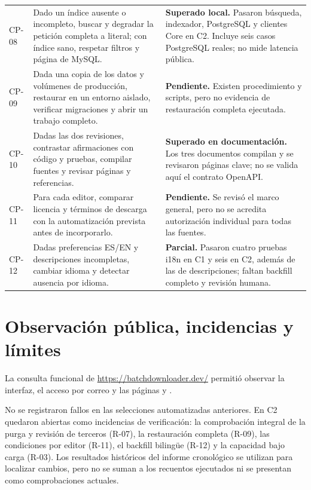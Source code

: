 \begin{longtable}{p{}>{\raggedright\arraybackslash}p{}>{\raggedright\arraybackslash}p{}}
CP-08 & Dado un índice ausente o incompleto, buscar y degradar la petición completa a literal; con índice sano, respetar filtros y página de MySQL. & \textbf{Superado local.} Pasaron búsqueda, indexador, PostgreSQL y clientes Core en C2. Incluye seis casos PostgreSQL reales; no mide latencia pública.\\
CP-09 & Dada una copia de los datos y volúmenes de producción, restaurar en un entorno aislado, verificar migraciones y abrir un trabajo completo. & \textbf{Pendiente.} Existen procedimiento y scripts, pero no evidencia de restauración completa ejecutada.\\
CP-10 & Dadas las dos revisiones, contrastar afirmaciones con código y pruebas, compilar fuentes y revisar páginas y referencias. & \textbf{Superado en documentación.} Los tres documentos compilan y se revisaron páginas clave; no se valida aquí el contrato OpenAPI.\\
CP-11 & Para cada editor, comparar licencia y términos de descarga con la automatización prevista antes de incorporarlo. & \textbf{Pendiente.} Se revisó el marco general, pero no se acredita autorización individual para todas las fuentes.\\
CP-12 & Dadas preferencias ES/EN y descripciones incompletas, cambiar idioma y detectar ausencia por idioma. & \textbf{Parcial.} Pasaron cuatro pruebas i18n en C1 y seis en C2, además de las de descripciones; faltan backfill completo y revisión humana.\\
\bottomrule
\end{longtable}
\endgroup

\section{Observación pública, incidencias y límites}

La consulta funcional de \url{https://batchdownloader.dev/} permitió observar la interfaz, el acceso por correo y las páginas  y .

No se registraron fallos en las selecciones automatizadas anteriores. En C2 quedaron abiertas como incidencias de verificación: la comprobación integral de la purga y revisión de terceros (R-07), la restauración completa (R-09), las condiciones por editor (R-11), el backfill bilingüe (R-12) y la capacidad bajo carga (R-03). Los resultados históricos del informe cronológico se utilizan para localizar cambios, pero no se suman a los recuentos ejecutados ni se presentan como comprobaciones actuales.

